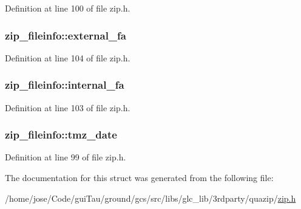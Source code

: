 Definition at line 100 of file zip.\-h.

\hypertarget{structzip__fileinfo_ac0be78ded330ffd46815bafc5b6b37bb}{
\subsubsection[{external\-\_\-fa}]{ zip\-\_\-fileinfo\-::external\-\_\-fa}}\label{structzip__fileinfo_ac0be78ded330ffd46815bafc5b6b37bb}


Definition at line 104 of file zip.\-h.

\hypertarget{structzip__fileinfo_a396175a434b86115ce5600ab1dbb1644}{
\subsubsection[{internal\-\_\-fa}]{ zip\-\_\-fileinfo\-::internal\-\_\-fa}}\label{structzip__fileinfo_a396175a434b86115ce5600ab1dbb1644}


Definition at line 103 of file zip.\-h.

\hypertarget{structzip__fileinfo_ae09a694a598b7507d23705764c9e46fb}{
\subsubsection[{tmz\-\_\-date}]{ zip\-\_\-fileinfo\-::tmz\-\_\-date}}\label{structzip__fileinfo_ae09a694a598b7507d23705764c9e46fb}


Definition at line 99 of file zip.\-h.



The documentation for this struct was generated from the following file\-:\begin{DoxyCompactItemize}
\item 
/home/jose/\-Code/gui\-Tau/ground/gcs/src/libs/glc\-\_\-lib/3rdparty/quazip/\hyperlink{zip_8h}{zip.\-h}\end{DoxyCompactItemize}
